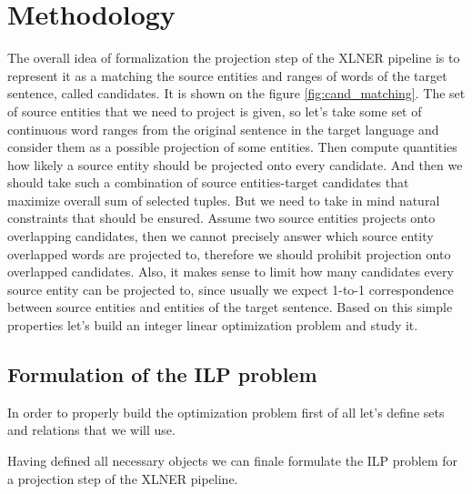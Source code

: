 \chapter{Methodology}
\label{sec:methodology}
The overall idea of formalization the projection step of the XLNER pipeline
is to represent it as a matching the source entities and ranges of words
of the target sentence, called candidates. It is shown on the figure \ref{fig:cand_matching}.
The set of source entities that we need to project is given, so let's take some set of
continuous word ranges from the original sentence in the target language
and consider them as a possible projection of some entities. Then compute
quantities how likely a source entity should be projected onto every candidate.
And then we should take such a combination of source entities-target candidates
that maximize overall sum of selected tuples. But we need to take in mind
natural constraints that should be ensured. Assume two source entities
projects onto overlapping candidates, then we cannot precisely answer which source
entity overlapped words are projected to, therefore we should prohibit projection
onto overlapped candidates. Also, it makes sense to limit how many candidates every
source entity can be projected to, since usually we expect 1-to-1 correspondence
between source entities and entities of the target sentence. Based on this simple
properties let's build an integer linear optimization problem and study it.

\section{Formulation of the ILP problem}
In order to properly build the optimization problem first of all let's define
sets and relations that we will use.

\begin{definition}

\end{definition}
\begin{definition}

\end{definition}

\begin{definition} \label{def:overlapping}

\end{definition}

Having defined all necessary objects we can finale formulate the ILP problem for a
projection step of the XLNER pipeline.

